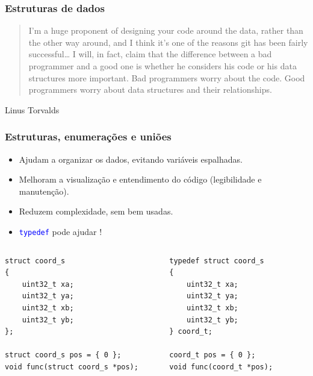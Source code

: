 \documentclass{beamer}
\begin{document}
\begin{frame}
	\frametitle{Estruturas de dados}
	\begin{quote}
		I’m a huge proponent of designing your code around the data, rather than the other way around, and I think it’s one of the reasons git has been fairly successful… I will, in fact, claim that the difference between a bad programmer and a good one is whether he considers his code or his data structures more important. Bad programmers worry about the code. Good programmers worry about data structures and their relationships.
	\end{quote}
	\begin{flushright}
	Linus Torvalds
	\end{flushright}
\end{frame}

\begin{frame}[fragile]
	\frametitle{Estruturas, enumerações e uniões}
	\begin{itemize}
	\item Ajudam a organizar os dados, evitando variáveis espalhadas.
	\item Melhoram a visualização e entendimento do código (legibilidade e manutenção).
	\item Reduzem complexidade, sem bem usadas.
	\item \texttt{\textcolor{blue}{typedef}} pode ajudar !
	\end{itemize}
	\begin{columns}[T] %
		\begin{column}{.5\textwidth}
	\begin{lstlisting}[style=customc]
struct coord_s
{
	uint32_t xa;
	uint32_t ya;
	uint32_t xb;
	uint32_t yb;			
};

struct coord_s pos = { 0 };
void func(struct coord_s *pos);
	\end{lstlisting}
		\end{column}%
		\hfill%
		\begin{column}{.5\textwidth}
	\begin{lstlisting}[style=customc]
typedef struct coord_s
{
	uint32_t xa;
	uint32_t ya;
	uint32_t xb;
	uint32_t yb;			
} coord_t;

coord_t pos = { 0 };
void func(coord_t *pos);
	\end{lstlisting}				
		\end{column}%
	\end{columns}
\end{frame}
\end{document}
